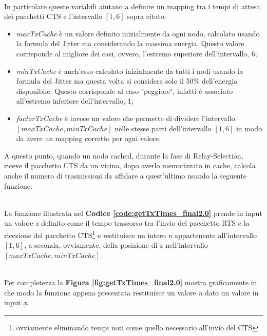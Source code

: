 \\

In particolare queste variabili aiutano a definire un mapping tra i tempi di attesa dei pacchetti CTS e l'intervallo \([1, 6]\) sopra citato:
\begin{itemize}
    \item \textit{maxTxCache} è un valore definito inizialmente da ogni nodo, calcolato usando la formula del Jitter ma considerando la massima energia. Questo valore corrisponde al migliore dei casi, ovvero, l'estremo superiore dell'intervallo, 6;
    \item \textit{minTxCache} è anch'esso calcolato inizialmente da tutti i nodi usando la formula del Jitter ma questa volta si considera solo il 50\% dell'energia disponibile. Questo corrisponde al caso "peggiore", infatti è associato all'estremo inferiore dell'intervallo, 1;
    \item \textit{factorTxCache} è invece un valore che permette di dividere l'intervallo\\ \([maxTxCache, minTxCache]\) nelle stesse parti dell'intervallo \([1, 6]\) in modo da avere un mapping corretto per ogni valore.
\end{itemize}

A questo punto, quando un nodo cached, durante la fase di Relay-Selection, riceve il pacchetto CTS da un vicino, dopo averlo memorizzato in cache, calcola anche il numero di trasmissioni da affidare a quest'ultimo usando la seguente funzione:

\\

La funzione illustrata nel \textbf{Codice \ref{code:getTxTimes_final2.0}} prende in input un valore \textit{x} definito come il tempo trascorso tra l'invio del pacchetto RTS e la ricezione del pacchetto CTS\footnote{ovviamente eliminando tempi noti come quello necessario all'invio del CTS} e restituisce un intero \textit{n} appartenente all'intervallo \([1, 6]\), a seconda, ovviamente, della posizione di \textit{x} nell'intervallo \([maxTxCache, minTxCache]\).\\
\\

\newpage

Per completezza la \textbf{Figura \ref{fig:getTxTimes_final2.0}} mostra graficamente in che modo la funzione appena presentata restituisce un valore \textit{n} dato un valore in input \textit{x}.

